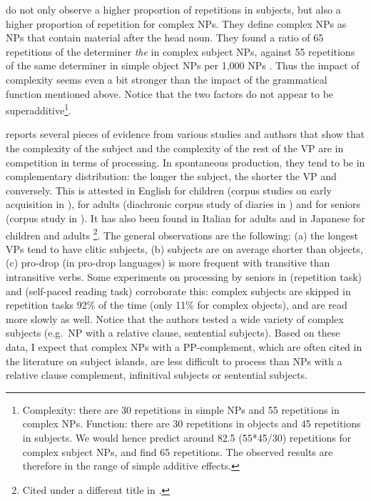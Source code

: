 \citet[213]{Clark.1998} do not only observe a higher proportion of repetitions in subjects, but also a higher proportion of repetition for complex NPs. They define complex NPs as NPs that contain material after the head noun. They found a ratio of 65 repetitions of the determiner \emph{the} in complex subject NPs, against 55 repetitions of the same determiner in simple object NPs per 1,000 NPs \citep[213]{Clark.1998}. Thus the impact of complexity seems even a bit stronger than the impact of the grammatical function mentioned above. Notice that the two factors do not appear to be superadditive\footnote{Complexity: there are 30 repetitions in simple NPs and 55 repetitions in complex NPs. Function: there are 30 repetitions in objects and 45 repetitions in subjects. We would hence predict around 82.5 (55*45/30) repetitions for complex subject NPs, and \citeauthor{Clark.1998} find 65 repetitions. The observed results are therefore in the range of simple additive effects.}.

\citet{Kluender.2004} reports several pieces of evidence from various studies and authors that show that the complexity of the subject and the complexity of the rest of the VP are in competition in terms of processing. In spontaneous production, they tend to be in complementary distribution: the longer the subject, the shorter the VP and conversely. This is attested in English for children (corpus studies on early acquisition in \citealt{Bloom.1990,Bloom.1993}), for adults (diachronic corpus study of diaries in \citealt{Kemper.1987}) and for seniors (corpus study in \citealt{Kynette.1986}). It has also been found in Italian for adults \citep[440]{Hyams.1993} and in Japanese for children and adults \citep{Ueno.2009}\footnote{Cited under a different title in \citet{Kluender.2004}.}. The general observations are the following: (a) the longest VPs tend to have clitic subjects, (b) subjects are on average shorter than objects, (c) pro-drop (in pro-drop languages) is more frequent with transitive than intransitive verbs. Some experiments on processing by seniors in \citet{Kemper.1986} (repetition task) and \citet{Norman.1992} (self-paced reading task) corroborate this: complex subjects are skipped in repetition tasks 92\% of the time (only 11\% for complex objects), and are read more slowly as well. Notice that the authors tested a wide variety of complex subjects (e.g.\ NP with a relative clause, sentential subjects). Based on these data, I expect that complex NPs with a PP-complement, which are often cited in the literature on subject islands, are less difficult to process than NPs with a relative clause complement, infinitival subjects or sentential subjects. 

